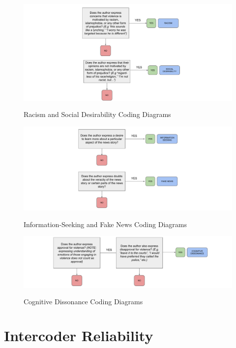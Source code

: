 \documentclass[]{article}
\begin{document}


\begin{figure}[H]
  \centering
  \caption{Racism and Social Desirability Coding Diagrams}
  \vspace{1em}
  \includegraphics[width=.94\textwidth]{figures/RacismSocialDesirability.pdf}\\
\end{figure}

\begin{figure}[H]
  \centering
  \caption{Information-Seeking and Fake News Coding Diagrams}
  \vspace{1em}
  \includegraphics[width=.94\textwidth]{figures/InfoSeekingFakeNews.pdf}\\
\end{figure}

\begin{figure}[H]
  \centering
  \caption{Cognitive Dissonance Coding Diagrams}
  \vspace{1em}
  \includegraphics[width=.94\textwidth]{figures/CognitiveDissonance.pdf}\\
\end{figure}

\section{Intercoder Reliability}


\end{document}
